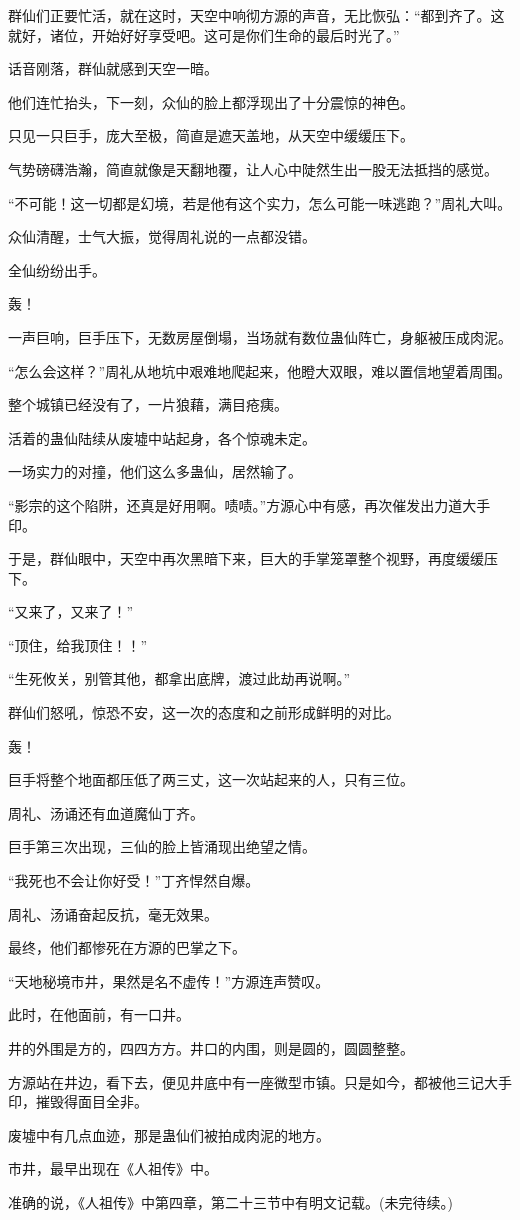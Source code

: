 \begin{this_body}
群仙们正要忙活，就在这时，天空中响彻方源的声音，无比恢弘：“都到齐了。这就好，诸位，开始好好享受吧。这可是你们生命的最后时光了。”

话音刚落，群仙就感到天空一暗。

他们连忙抬头，下一刻，众仙的脸上都浮现出了十分震惊的神色。

只见一只巨手，庞大至极，简直是遮天盖地，从天空中缓缓压下。

气势磅礴浩瀚，简直就像是天翻地覆，让人心中陡然生出一股无法抵挡的感觉。

“不可能！这一切都是幻境，若是他有这个实力，怎么可能一味逃跑？”周礼大叫。

众仙清醒，士气大振，觉得周礼说的一点都没错。

全仙纷纷出手。

轰！

一声巨响，巨手压下，无数房屋倒塌，当场就有数位蛊仙阵亡，身躯被压成肉泥。

“怎么会这样？”周礼从地坑中艰难地爬起来，他瞪大双眼，难以置信地望着周围。

整个城镇已经没有了，一片狼藉，满目疮痍。

活着的蛊仙陆续从废墟中站起身，各个惊魂未定。

一场实力的对撞，他们这么多蛊仙，居然输了。

“影宗的这个陷阱，还真是好用啊。啧啧。”方源心中有感，再次催发出力道大手印。

于是，群仙眼中，天空中再次黑暗下来，巨大的手掌笼罩整个视野，再度缓缓压下。

“又来了，又来了！”

“顶住，给我顶住！！”

“生死攸关，别管其他，都拿出底牌，渡过此劫再说啊。”

群仙们怒吼，惊恐不安，这一次的态度和之前形成鲜明的对比。

轰！

巨手将整个地面都压低了两三丈，这一次站起来的人，只有三位。

周礼、汤诵还有血道魔仙丁齐。

巨手第三次出现，三仙的脸上皆涌现出绝望之情。

“我死也不会让你好受！”丁齐悍然自爆。

周礼、汤诵奋起反抗，毫无效果。

最终，他们都惨死在方源的巴掌之下。

“天地秘境市井，果然是名不虚传！”方源连声赞叹。

此时，在他面前，有一口井。

井的外围是方的，四四方方。井口的内围，则是圆的，圆圆整整。

方源站在井边，看下去，便见井底中有一座微型市镇。只是如今，都被他三记大手印，摧毁得面目全非。

废墟中有几点血迹，那是蛊仙们被拍成肉泥的地方。

市井，最早出现在《人祖传》中。

准确的说，《人祖传》中第四章，第二十三节中有明文记载。(未完待续。)

\end{this_body}

